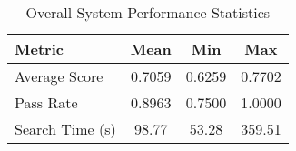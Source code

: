 \begin{table}[!htbp]
\centering
\begin{small}
\renewcommand\arraystretch{1.1}
\begin{tabular}{|l|c|c|c|}
\hline
\textbf{Metric} & \textbf{Mean} & \textbf{Min} & \textbf{Max} \\
\hline
Average Score & 0.7059 & 0.6259 & 0.7702 \\
Pass Rate & 0.8963 & 0.7500 & 1.0000 \\
Search Time (s) & 98.77 & 53.28 & 359.51 \\
\hline
\end{tabular}
\end{small}
\caption{Overall System Performance Statistics}
\label{tab:system_stats}
\end{table}
